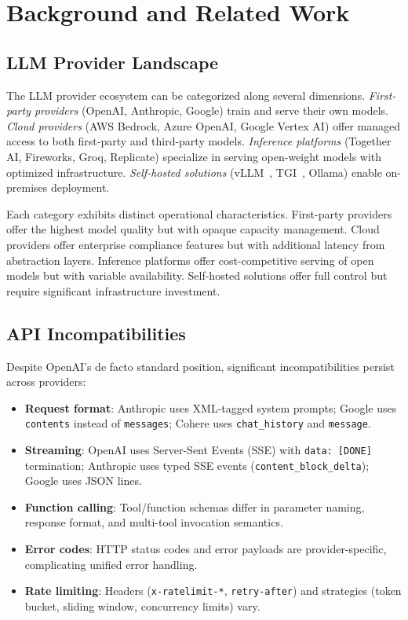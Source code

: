 \documentclass[11pt,twocolumn]{article}
\begin{document}
\section{Background and Related Work}
\label{sec:background}

\subsection{LLM Provider Landscape}

The LLM provider ecosystem can be categorized along several dimensions. \textit{First-party providers} (OpenAI, Anthropic, Google) train and serve their own models. \textit{Cloud providers} (AWS Bedrock, Azure OpenAI, Google Vertex AI) offer managed access to both first-party and third-party models. \textit{Inference platforms} (Together AI, Fireworks, Groq, Replicate) specialize in serving open-weight models with optimized infrastructure. \textit{Self-hosted solutions} (vLLM~\cite{kwon2023vllm}, TGI~\cite{tgi2023}, Ollama) enable on-premises deployment.

Each category exhibits distinct operational characteristics. First-party providers offer the highest model quality but with opaque capacity management. Cloud providers offer enterprise compliance features but with additional latency from abstraction layers. Inference platforms offer cost-competitive serving of open models but with variable availability. Self-hosted solutions offer full control but require significant infrastructure investment.

\subsection{API Incompatibilities}

Despite OpenAI's de facto standard position, significant incompatibilities persist across providers:

\begin{itemize}[leftmargin=*]
    \item \textbf{Request format}: Anthropic uses XML-tagged system prompts; Google uses \texttt{contents} instead of \texttt{messages}; Cohere uses \texttt{chat\_history} and \texttt{message}.
    \item \textbf{Streaming}: OpenAI uses Server-Sent Events (SSE) with \texttt{data: [DONE]} termination; Anthropic uses typed SSE events (\texttt{content\_block\_delta}); Google uses JSON lines.
    \item \textbf{Function calling}: Tool/function schemas differ in parameter naming, response format, and multi-tool invocation semantics.
    \item \textbf{Error codes}: HTTP status codes and error payloads are provider-specific, complicating unified error handling.
    \item \textbf{Rate limiting}: Headers (\texttt{x-ratelimit-*}, \texttt{retry-after}) and strategies (token bucket, sliding window, concurrency limits) vary.
\end{itemize}
\end{document}
